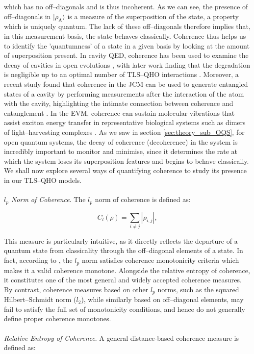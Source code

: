 \documentclass[12pt]{article}
\begin{document}
which has no off--diagonals and is thus incoherent. As we can see, the presence of off--diagonals in $|\rho_{\scriptscriptstyle \text{A}} \rangle$ is a measure of the superposition of the state, a property which is uniquely quantum. The lack of these off--diagonals therefore implies that, in this measurement basis, the state behaves classically. Coherence thus helps us to identify the 'quantumness' of a state in a given basis by looking at the amount of superposition present. In cavity QED, coherence has been used to examine the decay of cavities in open evolutions \cite{QResJCm2004-cQED_coherence}, with later work finding that the degradation is negligible up to an optimal number of TLS--QHO interactions \cite{CohEnt2020-Cavity_controlled_coherence}. Moreover, a recent study found that coherence in the JCM can be used to generate entangled states of a cavity by performing measurements after the interaction of the atom with the cavity, highlighting the intimate connection between coherence and entanglement \cite{CohEnt2024-2_JCM_coherence}. In the EVM, coherence can  sustain molecular vibrations that assist exciton energy transfer in representative biological systems such as dimers of light--harvesting complexes \cite{ExVib2014-Alexandra}. As we saw in section \ref{sec:theory_sub_OQS}, for open quantum systems, the decay of coherence (decoherence) in the system is incredibly important to monitor and minimise,  since it determines the rate at which the system loses its superposition features and begins to behave classically. We shall now explore several ways of quantifying coherence to study its presence in our TLS--QHO models. \\
\\
\textit{$l_p$ Norm of Coherence}. The $l_p$ norm of coherence is defined as:

\begin{equation}
    C_l(\rho) = \sum_{i\neq j} |\rho_{i,j}|, 
\end{equation}

This measure is particularly intuitive, as it directly reflects the departure of a quantum state from classicality through the off--diagonal elements of a state. In fact, according to \cite{Coherence2014-seed}, the $l_p$ norm satisfies coherence monotonicity criteria which makes it a valid coherence monotone. Alongside the relative entropy of coherence, it constitutes one of the most general and widely accepted coherence measures. By contrast, coherence measures based on other $l_p$ norms, such as the squared Hilbert–Schmidt norm ($l_2$), while similarly based on off--diagonal elements, may fail to satisfy the full set of monotonicity conditions, and hence do not generally define proper coherence monotones.\\
\\
\textit{Relative Entropy of Coherence}. A general distance-based coherence measure is defined as:
\end{document}
